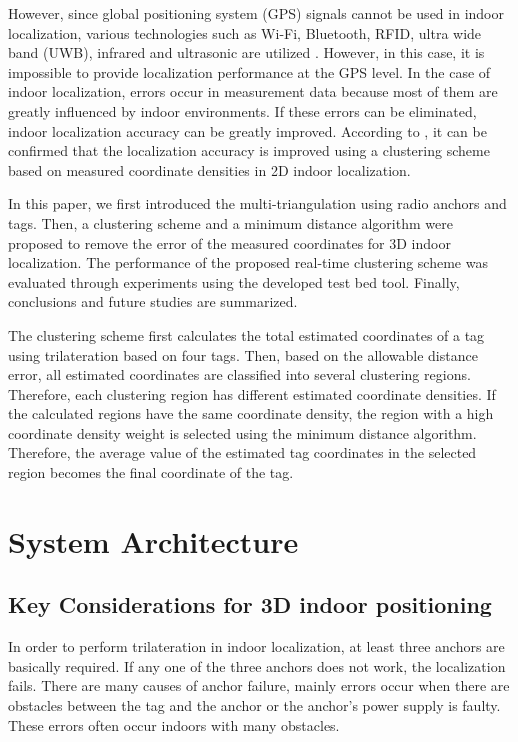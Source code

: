 \documentclass[conference]{IEEEtran}
\begin{document}
However, since global positioning system (GPS) signals cannot be used in indoor localization, various technologies such as Wi-Fi, Bluetooth, RFID, ultra wide band (UWB), infrared and ultrasonic are utilized \cite{b3}. However, in this case, it is impossible to provide localization performance at the GPS level. In the case of indoor localization, errors occur in measurement data because most of them are greatly influenced by indoor environments. If these errors can be eliminated, indoor localization accuracy can be greatly improved. According to \cite{b4,b5,b6}, it can be confirmed that the localization accuracy is improved using a clustering scheme based on measured coordinate densities in 2D indoor localization.

In this paper, we first introduced the multi-triangulation using radio anchors and tags. Then, a clustering scheme and a minimum distance algorithm were proposed to remove the error of the measured coordinates for 3D indoor localization. The performance of the proposed real-time clustering scheme was evaluated through experiments using the developed test bed tool. Finally, conclusions and future studies are summarized.

The clustering scheme first calculates the total estimated coordinates of a tag using trilateration based on four tags. Then, based on the allowable distance error, all estimated coordinates are classified into several clustering regions. Therefore, each clustering region has different estimated coordinate densities. If the calculated regions have the same coordinate density, the region with a high coordinate density weight is selected using the minimum distance algorithm. Therefore, the average value of the estimated tag coordinates in the selected region becomes the final coordinate of the tag.


\section{System Architecture}

\subsection{Key Considerations for 3D indoor positioning}
In order to perform trilateration in indoor localization, at least three anchors are basically required. If any one of the three anchors does not work, the localization fails. There are many causes of anchor failure, mainly errors occur when there are obstacles between the tag and the anchor or the anchor's power supply is faulty. These errors often occur indoors with many obstacles.
\end{document}
